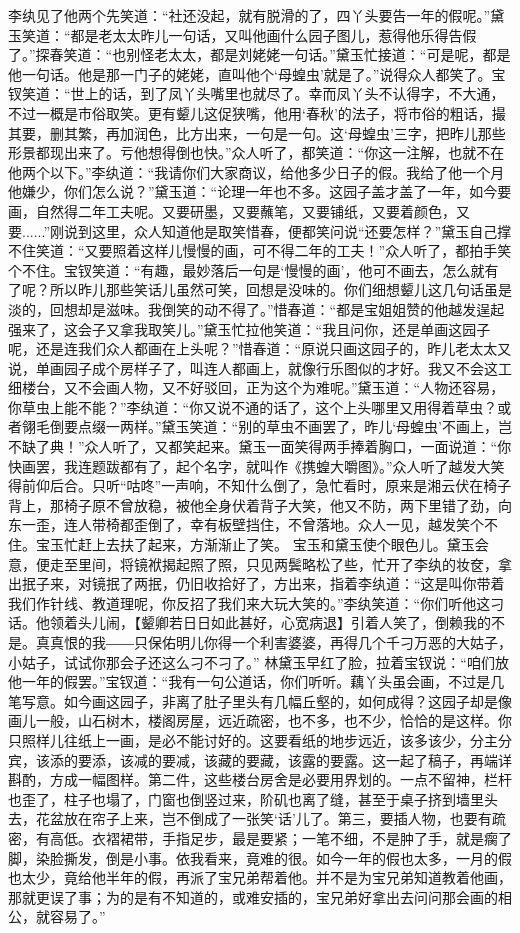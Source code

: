 \documentclass[12pt,oneside]{book}
\begin{document}
李纨见了他两个先笑道：“社还没起，就有脱滑的了，四丫头要告一年的假呢。”黛玉笑道：“都是老太太昨儿一句话，又叫他画什么园子图儿，惹得他乐得告假了。”探春笑道：“也别怪老太太，都是刘姥姥一句话。”黛玉忙接道：“可是呢，都是他一句话。他是那一门子的姥姥，直叫他个‘母蝗虫’就是了。”说得众人都笑了。宝钗笑道：“世上的话，到了凤丫头嘴里也就尽了。幸而凤丫头不认得字，不大通，不过一概是市俗取笑。更有颦儿这促狭嘴，他用‘春秋’的法子，将市俗的粗话，撮其要，删其繁，再加润色，比方出来，一句是一句。这‘母蝗虫’三字，把昨儿那些形景都现出来了。亏他想得倒也快。”众人听了，都笑道：“你这一注解，也就不在他两个以下。”李纨道：“我请你们大家商议，给他多少日子的假。我给了他一个月他嫌少，你们怎么说？”黛玉道：“论理一年也不多。这园子盖才盖了一年，如今要画，自然得二年工夫呢。又要研墨，又要蘸笔，又要铺纸，又要着颜色，又要......”刚说到这里，众人知道他是取笑惜春，便都笑问说“还要怎样？”黛玉自己撑不住笑道：“又要照着这样儿慢慢的画，可不得二年的工夫！”众人听了，都拍手笑个不住。宝钗笑道：“有趣，最妙落后一句是‘慢慢的画’，他可不画去，怎么就有了呢？所以昨儿那些笑话儿虽然可笑，回想是没味的。你们细想颦儿这几句话虽是淡的，回想却是滋味。我倒笑的动不得了。”惜春道：“都是宝姐姐赞的他越发逞起强来了，这会子又拿我取笑儿。”黛玉忙拉他笑道：“我且问你，还是单画这园子呢，还是连我们众人都画在上头呢？”惜春道：“原说只画这园子的，昨儿老太太又说，单画园子成个房样子了，叫连人都画上，就像行乐图似的才好。我又不会这工细楼台，又不会画人物，又不好驳回，正为这个为难呢。”黛玉道：“人物还容易，你草虫上能不能？”李纨道：“你又说不通的话了，这个上头哪里又用得着草虫？或者翎毛倒要点缀一两样。”黛玉笑道：“别的草虫不画罢了，昨儿‘母蝗虫’不画上，岂不缺了典！”众人听了，又都笑起来。黛玉一面笑得两手捧着胸口，一面说道：“你快画罢，我连题跋都有了，起个名字，就叫作《携蝗大嚼图》。”众人听了越发大笑得前仰后合。只听“咕咚”一声响，不知什么倒了，急忙看时，原来是湘云伏在椅子背上，那椅子原不曾放稳，被他全身伏着背子大笑，他又不防，两下里错了劲，向东一歪，连人带椅都歪倒了，幸有板壁挡住，不曾落地。众人一见，越发笑个不住。宝玉忙赶上去扶了起来，方渐渐止了笑。
宝玉和黛玉使个眼色儿。黛玉会意，便走至里间，将镜袱揭起照了照，只见两鬓略松了些，忙开了李纨的妆奁，拿出抿子来，对镜抿了两抿，仍旧收拾好了，方出来，指着李纨道：“这是叫你带着我们作针线、教道理呢，你反招了我们来大玩大笑的。”李纨笑道：“你们听他这刁话。他领着头儿闹，【颦卿若日日如此甚好，心宽病退】引着人笑了，倒赖我的不是。真真恨的我――只保佑明儿你得一个利害婆婆，再得几个千刁万恶的大姑子，小姑子，试试你那会子还这么刁不刁了。”
林黛玉早红了脸，拉着宝钗说：“咱们放他一年的假罢。”宝钗道：“我有一句公道话，你们听听。藕丫头虽会画，不过是几笔写意。如今画这园子，非离了肚子里头有几幅丘壑的，如何成得？这园子却是像画儿一般，山石树木，楼阁房屋，远近疏密，也不多，也不少，恰恰的是这样。你只照样儿往纸上一画，是必不能讨好的。这要看纸的地步远近，该多该少，分主分宾，该添的要添，该减的要减，该藏的要藏，该露的要露。这一起了稿子，再端详斟酌，方成一幅图样。第二件，这些楼台房舍是必要用界划的。一点不留神，栏杆也歪了，柱子也塌了，门窗也倒竖过来，阶矶也离了缝，甚至于桌子挤到墙里头去，花盆放在帘子上来，岂不倒成了一张笑‘话’儿了。第三，要插人物，也要有疏密，有高低。衣褶裙带，手指足步，最是要紧；一笔不细，不是肿了手，就是瘸了脚，染脸撕发，倒是小事。依我看来，竟难的很。如今一年的假也太多，一月的假也太少，竟给他半年的假，再派了宝兄弟帮着他。并不是为宝兄弟知道教着他画，那就更误了事；为的是有不知道的，或难安插的，宝兄弟好拿出去问问那会画的相公，就容易了。”
\end{document}
